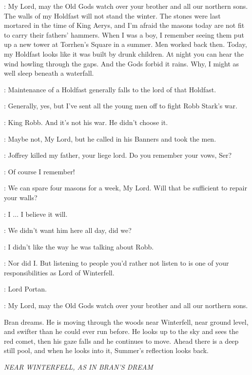 \NORTHERNLORD: My Lord, may the Old Gods watch over your brother and all our northern sons. The walls of my Holdfast will not stand the winter. The stones were last mortared in the time of King Aerys, and I'm afraid the masons today are not fit to carry their fathers' hammers. When I was a boy, I remember seeing them put up a new tower at Torrhen's Square in a summer. Men worked back then. Today, my Holdfast looks like it was built by drunk children. At night you can hear the wind howling through the gaps. And the Gods forbid it rains. Why, I might as well sleep beneath a waterfall.

\LUWIN: Maintenance of a Holdfast generally falls to the lord of that Holdfast.

\NORTHERNLORD: Generally, yes, but I've sent all the young men off to fight Robb Stark's war.

\BRAN: King Robb. And it's not his war. He didn't choose it.

\NORTHERNLORD: Maybe not, My Lord, but he called in his Banners and took the men.

\BRAN: Joffrey killed my father, your liege lord. Do you remember your vows, Ser?

\NORTHERNLORD: Of course I remember!

\LUWIN: We can spare four masons for a week, My Lord. Will that be sufficient to repair your walls?

\NORTHERNLORD: I $\ldots$ I believe it will.


\LUWIN: We didn't want him here all day, did we?

\BRAN: I didn't like the way he was talking about Robb.

\LUWIN: Nor did I. But listening to people you'd rather not listen to is one of your responsibilities as Lord of Winterfell.

\HERALD: Lord Portan.

\PORTAN: My Lord, may the Old Gods watch over your brother and all our northern sons.


\scene

\n Bran dreams. He is moving through the woods near Winterfell, near ground level, and swifter than he could ever run before. He looks up to the sky and sees the red comet, then his gaze falls and he continues to move. Ahead there is a deep still pool, and when he looks into it, Summer's reflection looks back.

\scene

\textit{NEAR WINTERFELL, AS IN BRAN'S DREAM}

